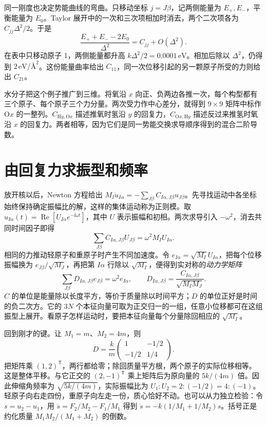 同一刚度也决定势能曲线的弯曲。只移动坐标 $j=J\beta$，记两侧能量为 $E_+,E_-$，平衡能量为 $E_0$。Taylor 展开中的一次和三次项相加时消去，两个二次项各为 $C_{jj}\Delta^2/2$。于是
\begin{equation}\label{phonon:energy-check}
 \frac{E_++E_--2E_0}{\Delta^2}=C_{jj}+O(\Delta^2).
\end{equation}
在表中只移动原子 1，两侧能量都升高 $k\Delta^2/2=0.0001\,\mathrm{eV}$。相加后除以 $\Delta^2$，仍得到 $2\,\mathrm{eV}/\text{\AA}^2$。这份能量曲率给出 $C_{11}$，同一次位移引起的另一颗原子所受的力则给出 $C_{21}$。

水分子把这个例子推广到三维。将氧沿 $x$ 向正、负两边各推一次，每个构型都有三个原子、每个原子三个力分量。两次受力作中心差分，就得到 $9\times9$ 矩阵中标作 $\mathrm O x$ 的一整列。$C_{\mathrm H y,\mathrm O x}$ 描述推氧时氢沿 $y$ 的回复力，$C_{\mathrm O x,\mathrm H y}$ 描述反过来推氢时氧沿 $x$ 的回复力。两者相等，因为它们是同一势能交换求导顺序得到的混合二阶导数。

\section{由回复力求振型和频率}
放开核以后，Newton 方程给出 $M_I\ddot u_{I\alpha}=-\sum_{J\beta}C_{I\alpha,J\beta}u_{J\beta}$。先寻找运动中各坐标始终保持确定振幅比的解，这样的集体运动称为正则模。取 $u_{I\alpha}(t)=\operatorname{Re}[U_{I\alpha}e^{-\ii\omega t}]$，其中 $U$ 表示振幅和初相。两次求导引入 $-\omega^2$，消去共同时间因子即得
\[
 \sum_{J\beta}C_{I\alpha,J\beta}U_{J\beta}=\omega^2 M_I U_{I\alpha}.
\]
相同的力推动轻原子和重原子时产生不同加速度。令 $e_{I\alpha}=\sqrt{M_I}U_{I\alpha}$，把每个位移振幅换为 $e_{J\beta}/\sqrt{M_J}$，再把第 $I\alpha$ 行除以 $\sqrt{M_I}$，便得到实对称的\emph{动力学矩阵}
\begin{equation}\label{phonon:dynamical}
 \sum_{J\beta} D_{I\alpha,J\beta}e_{J\beta}=\omega^2 e_{I\alpha},
 \qquad D_{I\alpha,J\beta}=\frac{C_{I\alpha,J\beta}}{\sqrt{M_I M_J}} .
\end{equation}
$C$ 的单位是能量除以长度平方，等价于质量除以时间平方；$D$ 的单位正好是时间的负二次方。它的 $3N$ 个本征向量可取为正交归一的一组，任意小位移都可在这组振型上展开。看原子怎样运动时，要把本征向量每个分量除回相应的 $\sqrt{M_I}$。

回到刚才的键。让 $M_1=m$、$M_2=4m$，则
\[
 D=\frac{k}{m}\begin{pmatrix}1&-1/2\\-1/2&1/4\end{pmatrix}.
\]
把矩阵乘 $(1,2)^{\mathsf T}$，两行都给零；除回质量平方根，两个原子的实际位移相等。这是整体平移。与它正交的 $(2,-1)^{\mathsf T}$ 乘上矩阵后为原向量的 $5k/(4m)$ 倍。因此伸缩角频率为 $\sqrt{5k/(4m)}$，实际振幅比为 $U_1:U_2=2:(-1/2)=4:(-1)$。轻原子向右走四份，重原子向左走一份，质心恰好不动。也可以从力独立检验：令 $s=u_2-u_1$，用 $\ddot s=F_2/M_2-F_1/M_1$ 得到 $\ddot s=-k(1/M_1+1/M_2)s$。括号正是约化质量 $M_1M_2/(M_1+M_2)$ 的倒数。

